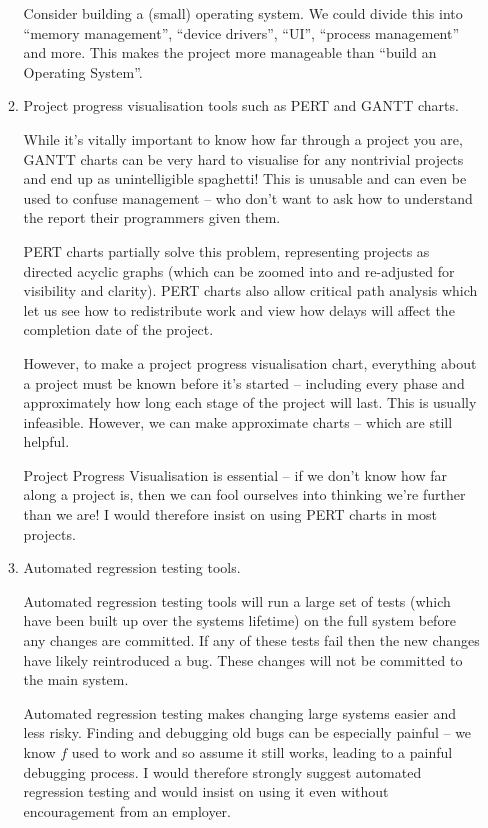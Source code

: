 \documentclass[10pt,\jkfside,a4paper]{article}
\begin{document}
\begin{enumerate}
\begin{enumerate}
Consider building a (small) operating system. We could divide this into
``memory management'', ``device drivers'', ``UI'', ``process management''
and more. This makes the project more manageable than ``build an Operating
System''.

\item Project progress visualisation tools such as PERT and GANTT charts.

While it's vitally important to know how far through a project you are,
GANTT charts can be very hard to visualise for any nontrivial projects
and end up as unintelligible spaghetti! This is unusable and can even
be used to confuse management -- who don't want to ask how to understand
the report their programmers given them.

PERT charts partially solve this problem, representing projects as directed
acyclic graphs (which can be zoomed into and re-adjusted for visibility and
clarity). PERT charts also allow critical path analysis which let us see how
to redistribute work and view how delays will affect the completion date of
the project.

However, to make a project progress visualisation chart, everything about a
project must be known before it's started -- including every phase and
approximately how long each stage of the project will last. This is usually
infeasible. However, we can make approximate charts -- which are still helpful.

Project Progress Visualisation is essential -- if we don't know how far along
a project is, then we can fool ourselves into thinking we're further than we
are! I would therefore insist on using PERT charts in most projects.

\item Automated regression testing tools.

Automated regression testing tools will run a large set of tests (which have
been built up over the systems lifetime) on the full system before any changes
are committed. If any of these tests fail then the new changes have likely
reintroduced a bug. These changes will not be committed to the main system.

Automated regression testing makes changing large systems easier and less
risky. Finding and debugging old bugs can be especially painful -- we know
$f$ used to work and so assume it still works, leading to a painful
debugging process. I would therefore strongly suggest automated regression
testing and would insist on using it even without encouragement from an
employer.


\end{enumerate}
\end{enumerate}
\end{document}
